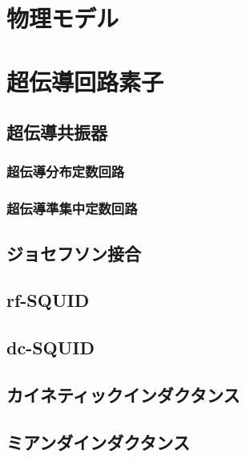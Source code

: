 \section{物理モデル}

\section{超伝導回路素子}

    \subsection{超伝導共振器}

        \subsubsection{超伝導分布定数回路}

        \subsubsection{超伝導準集中定数回路}

    \subsection{ジョセフソン接合}

    \subsection{rf-SQUID}

    \subsection{dc-SQUID}

    \subsection{カイネティックインダクタンス}
    
    \subsection{ミアンダインダクタンス}
